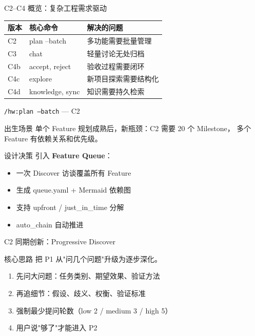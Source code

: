 \documentclass[theme=workflow,aspectratio=169,fontset=tech]{Hypo-Slide}
\begin{document}
\begin{frame}{C2--C4 概览：复杂工程需求驱动}
  \centering
  \begin{tabular}{lll}
    \toprule
    版本 & 核心命令 & 解决的问题 \\
    \midrule
    C2   & plan --batch    & 多功能需要批量管理 \\
    C3   & chat            & 轻量讨论无处归档 \\
    C4b  & accept, reject  & 验收过程需要闭环 \\
    C4c  & explore         & 新项目探索需要结构化 \\
    C4d  & knowledge, sync & 知识需要持久检索 \\
    \bottomrule
  \end{tabular}
\end{frame}

\begin{frame}{\texttt{/hw:plan --batch} — C2}
  \begin{block}{出生场景}
    单个 Feature 规划成熟后，新瓶颈：C2 需要 20 个 Milestone，
    多个 Feature 有依赖关系和优先级。
  \end{block}
  \begin{block}{设计决策}
    引入 \textbf{Feature Queue}：
    \begin{itemize}
      \item 一次 Discover 访谈覆盖所有 Feature
      \item 生成 queue.yaml + Mermaid 依赖图
      \item 支持 upfront / just\_in\_time 分解
      \item auto\_chain 自动推进
    \end{itemize}
  \end{block}
\end{frame}

\begin{frame}{C2 同期创新：Progressive Discover}
  \begin{block}{核心思路}
    把 P1 从"问几个问题"升级为逐步深化。
  \end{block}
  \begin{enumerate}
    \item 先问大问题：任务类别、期望效果、验证方法
    \item 再追细节：假设、歧义、权衡、验证标准
    \item 强制最少提问轮数（low 2 / medium 3 / high 5）
    \item 用户说"够了"才能进入 P2
  \end{enumerate}
\end{frame}
\end{document}
